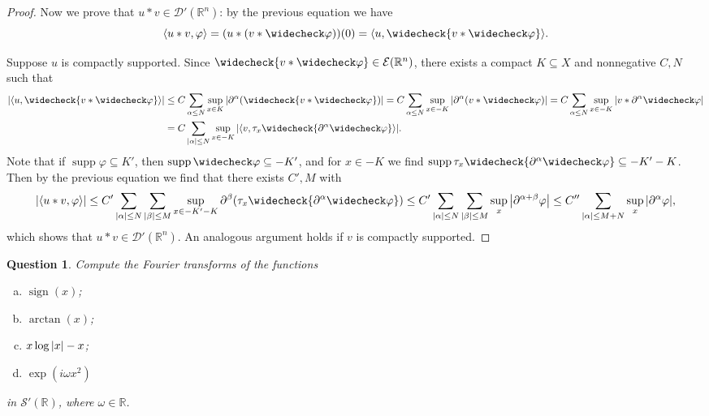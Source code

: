 \documentclass{article}
\theoremstyle{plain}
\newtheorem{question}{Question}
\theoremstyle{remark}
\renewcommand{\phi}{\varphi}
\newcommand{\Bb}{\mathbb}
\newcommand{\Cal}{\mathcal}
\newcommand{\RR}{\Bb R}
\newcommand{\DD}{\Cal D}
\newcommand\EE{\Cal E}
\renewcommand\SS{\Cal S}
\DeclarePairedDelimiter{\ang}{\langle}{\rangle}
\newcommand\pt\partial
\newcommand\refl\widecheck
\DeclareMathOperator{\sign}{sign}
\DeclareMathOperator{\supp}{supp}
\begin{document}
\begin{proof}
	Now we prove that $u * v \in \DD'(\RR^n)$: by the previous equation we have
	\[
	\ang{u * v, \phi} = (u * (v * \refl\phi))(0) = \ang{u, \refl{v * \refl\phi}}.
	\]
	
	Suppose $u$ is compactly supported. Since $\refl{v * \refl\phi} \in \EE(\RR^n)$, there exists a compact $K \subseteq X$ and nonnegative $C, N$ such that
	\begin{align*}
		\abs{\ang{u, \refl{v * \refl\phi}}} &\leq C \sum_{\alpha \leq N} \sup_{x \in K} \abs{\pt^\alpha (\refl{v * \refl\phi})} = C \sum_{\alpha \leq N} \sup_{x \in -K} \abs{\pt^\alpha (v * \refl\phi)} = C \sum_{\alpha \leq N} \sup_{x \in -K} \abs{v * \pt^\alpha\refl\phi}\\
		&= C \sum_{\abs{\alpha} \leq N} \sup_{x \in -K} \abs{\ang{v, \tau_x \refl{\pt^\alpha \refl\phi}}}.
	\end{align*}
	Note that if $\supp\phi \subseteq K'$, then $\supp\refl\phi \subseteq -K'$, and for $x \in -K$ we find $\supp \tau_x \refl{\pt^\alpha \refl\phi} \subseteq -K' -K$. Then by the previous equation we find that there exists $C', M$ with
	\[
	\abs{\ang{u * v, \phi}} \leq C' \sum_{\abs{\alpha} \leq N} \sum_{\abs{\beta} \leq M} \sup_{x \in -K' - K} \pt^\beta (\tau_x \refl{\pt^\alpha \refl\phi}) \leq C' \sum_{\abs{\alpha} \leq N} \sum_{\abs{\beta} \leq M} \sup_x \abs{\pt^{\alpha + \beta} \phi} \leq C'' \sum_{\abs{\alpha} \leq M + N} \sup_x \abs{\pt^\alpha \phi},
	\]
	which shows that $u* v \in \DD'(\RR^n)$. An analogous argument holds if $v$ is compactly supported. 
\end{proof}

\setcounter{question}{18}

\begin{question}
	Compute the Fourier transforms of the functions
	\begin{enumerate}[(a)]
		\item $\sign(x)$;
		\item $\arctan(x)$;
		\item $x\log \abs{x} - x$;
		\item $\exp(i\omega x^2)$
	\end{enumerate}
	in $\SS'(\RR)$, where $\omega \in \RR$. 
\end{question}
\end{document}
